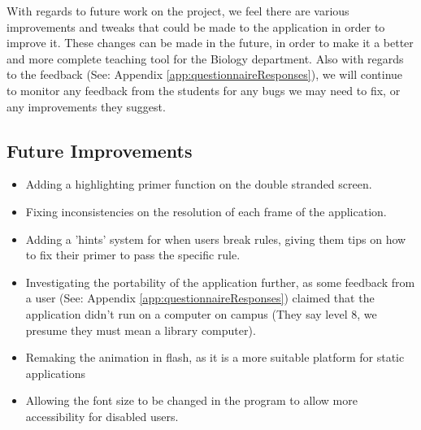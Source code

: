 
With regards to future work on the project, we feel there are various improvements and tweaks that could be made to the application in order to improve it. These changes can be made in the future, in order to make it a better and more complete teaching tool for the Biology department. Also with regards to the feedback (See: Appendix \ref{app:questionnaireResponses}), we will continue to monitor any feedback from the students for any bugs we may need to fix, or any improvements they suggest.

\subsection{Future Improvements}

\begin{itemize}

\item Adding a highlighting primer function on the double stranded screen.

\item Fixing inconsistencies on the resolution of each frame of the application.

\item Adding a 'hints' system for when users break rules, giving them tips on how to fix their primer to pass the specific rule.

\item Investigating the portability of the application further, as some feedback from a user (See: Appendix \ref{app:questionnaireResponses}) claimed that the application didn't run on a computer on campus (They say level 8, we presume they must mean a library computer).

\item Remaking the animation in flash, as it is a more suitable platform for static applications

\item Allowing the font size to be changed in the program to allow more accessibility for disabled users.

 

\end{itemize}











